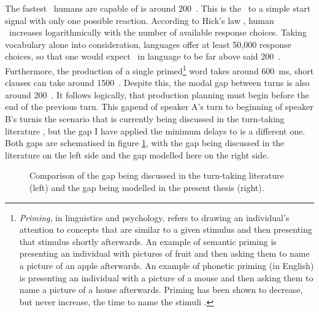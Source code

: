 The fastest \rt\ humans are capable of is around 200~\ms.
This is the \rt\ to a simple start signal with only one possible reaction.
According to Hick's law \citep{hick_rate_1952}, human \rt\ increases logarithmically with the number of available response choices.
Taking vocabulary alone into consideration, languages offer at least 50,000 response choices, so that one would expect \rt\ in language to be far above said 200~\ms.
Furthermore, the production of a single primed\footnote{\emph{Priming}, in linguistics and psychology, refers to drawing an individual's attention to concepts that are similar to a given stimulus and then presenting that stimulus shortly afterwards. An example of semantic priming is presenting an individual with pictures of fruit and then asking them to name a picture of an apple afterwards. An example of phonetic priming (in English) is presenting an individual with a picture of a mouse and then asking them to name a picture of a house afterwards. Priming has been shown to decrease, but never increase, the time to name the stimuli \citep[]{traxler_introduction_2012}.}
word takes around 600~ms, short clauses can take around 1500~\ms.
Despite this, the modal gap between turns is also around 200~\ms.
It follows logically, that production planning must begin before the end of the previous turn.
This gap\dash end of speaker A's turn to beginning of speaker B's turn\dash is the scenario that is currently being discussed in the turn-taking literature \citep[e.g.][among many others]{bogels_listeners_2015,bogels_planning_2018,garrod_use_2015,levinson_timing_2015,riest_anticipation_2015}, but the gap I have applied the minimum delays to is a different one.
Both gaps are schematised in figure \ref{fig:gaps}, with the gap being discussed in the literature on the left side and the gap modelled here on the right side.

\begin{figure}
	\centering
	
	\label{fig:gaps}
	\caption[Gap in the literature vs gap in the present thesis.]{Comparison of the gap being discussed in the turn-taking literature (left) and the gap being modelled in the present thesis (right).}
\end{figure}

